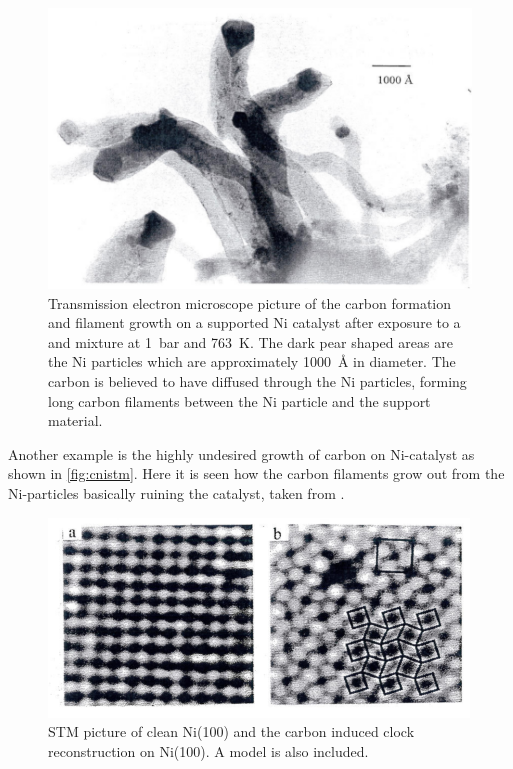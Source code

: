 \begin{figure}[h!]
	\begin{center}
	\includegraphics[scale=4]{figures/10_17.png}
	\caption{Transmission electron microscope picture of the carbon formation and filament growth on a  supported Ni catalyst after exposure to a  and  mixture at \SI{1}{bar} and \SI{763}{K}. The dark pear shaped areas are the Ni particles which are approximately \SI{1000}{\angstrom} in diameter. The carbon is believed to have diffused through the Ni particles, forming long carbon filaments between the Ni particle and the support material.}
	\label{fig:cnisio2tem}
	\end{center}
\end{figure}

Another example is the highly undesired growth of carbon on Ni-catalyst as shown in \autoref{fig:cnistm}. Here it is seen how the carbon filaments grow out from the Ni-particles basically ruining the catalyst, taken from \cite{carbon}.

\begin{figure}[h!]
	\begin{center}
	\includegraphics[scale=4]{figures/10_18.png}
	\caption{STM picture of clean Ni(100) and the carbon induced clock reconstruction on Ni(100). A model is also included.}
	\label{fig:cnistm}
	\end{center}
\end{figure}

